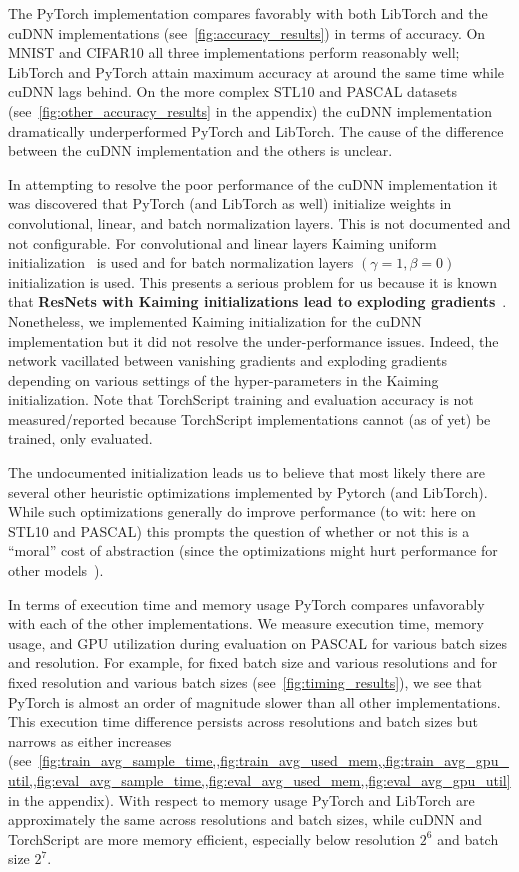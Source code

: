 

The PyTorch implementation compares favorably with both LibTorch and the cuDNN implementations (see~\cref{fig:accuracy_results}) in terms of accuracy.
On MNIST and CIFAR10 all three implementations perform reasonably well;
LibTorch and PyTorch attain maximum accuracy at around the same time while cuDNN lags behind.
On the more complex STL10 and PASCAL datasets (see~\cref{fig:other_accuracy_results} in the appendix) the cuDNN implementation dramatically underperformed PyTorch and LibTorch.
The cause of the difference between the cuDNN implementation and the others is unclear.

In attempting to resolve the poor performance of the cuDNN implementation it was discovered that PyTorch (and LibTorch as well) initialize weights in convolutional, linear, and batch normalization layers.
This is not documented and not configurable.
For convolutional and linear layers Kaiming uniform initialization~\cite{he2015delving} is used and for batch normalization layers $(\gamma=1,\beta=0)$ initialization is used.
This presents a serious problem for us because it is known that \textbf{ResNets with Kaiming initializations lead to exploding gradients}~\cite{zhang2019fixup}.
Nonetheless, we implemented Kaiming initialization for the cuDNN implementation but it did not resolve the under-performance issues.
Indeed, the network vacillated between vanishing gradients and exploding gradients depending on various settings of the hyper-parameters in the Kaiming initialization.
Note that TorchScript training and evaluation accuracy is not measured/reported because TorchScript implementations cannot (as of yet) be trained, only evaluated.

The undocumented initialization leads us to believe that most likely there are several other heuristic optimizations implemented by Pytorch (and LibTorch).
While such optimizations generally do improve performance (to wit: here on STL10 and PASCAL) this prompts the question of whether or not this is a ``moral'' cost of abstraction (since the optimizations might hurt performance for other models~\cite{zhang2019fixup}).



In terms of execution time and memory usage PyTorch compares unfavorably with each of the other implementations.
We measure execution time, memory usage, and GPU utilization during evaluation on PASCAL for various batch sizes and resolution.
For example, for fixed batch size and various resolutions and for fixed resolution and various batch sizes (see~\cref{fig:timing_results}), we see that PyTorch is almost an order of magnitude slower than all other implementations.
This execution time difference persists across resolutions and batch sizes but narrows as either increases (see~\cref{fig:train_avg_sample_time,,fig:train_avg_used_mem,,fig:train_avg_gpu_util,,fig:eval_avg_sample_time,,fig:eval_avg_used_mem,,fig:eval_avg_gpu_util} in the appendix).
With respect to memory usage PyTorch and LibTorch are approximately the same across resolutions and batch sizes, while cuDNN and TorchScript are more memory efficient, especially below resolution $2^6$ and batch size $2^7$.

